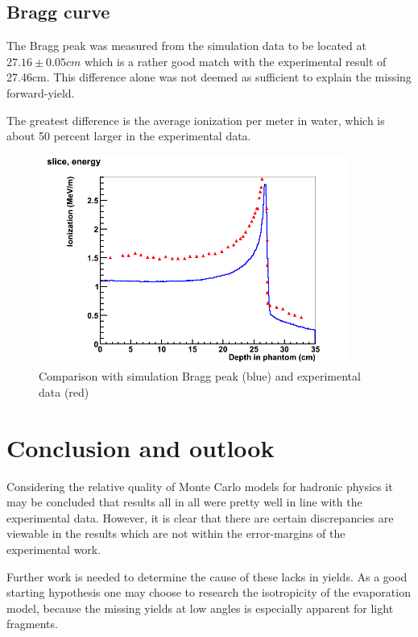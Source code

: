 \subsection{Bragg curve}
The Bragg peak was measured from the simulation data to be located at $27.16 \pm 0.05 cm$ which is a rather good match with the experimental result of 27.46cm. This difference alone was not deemed as sufficient to explain the missing forward-yield.

The greatest difference is the average ionization per meter in water, which is about 50 percent larger in the experimental data. %


\begin{figure}[h] 
\begin{center}
\includegraphics[width=0.9\textwidth]{images/plots/braggPeak/braggPeakComparisonToData.png}  
\caption{\label{fig:braggPeakCompared} Comparison with simulation Bragg peak (blue) and experimental data (red)}
 \end{center}
 \end{figure}

\clearpage
\section{Conclusion and outlook}
Considering the relative quality of Monte Carlo models for hadronic physics it may be concluded that results all in all were pretty well in line with the experimental data. However, it is clear that there are certain discrepancies are viewable in the results which are not within the error-margins of the experimental work.

Further work is needed to determine the cause of these lacks in yields. As a good starting hypothesis one may choose to research the isotropicity of the evaporation model, because the missing yields at low angles is especially apparent for light fragments.

